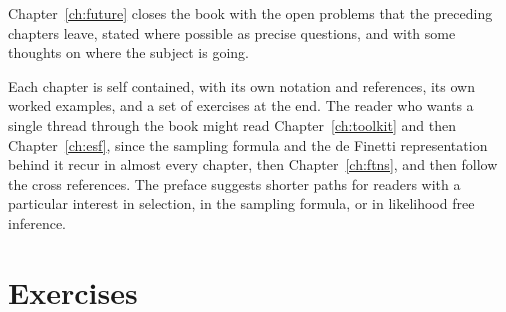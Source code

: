 Chapter~\ref{ch:future} closes the book with the open problems that the preceding chapters leave,
stated where possible as precise questions, and with some thoughts on where the subject is going.

Each chapter is self contained, with its own notation and references, its own worked examples, and
a set of exercises at the end. The reader who wants a single thread through the book might read
Chapter~\ref{ch:toolkit} and then Chapter~\ref{ch:esf}, since the sampling formula and the de
Finetti representation behind it recur in almost every chapter, then Chapter~\ref{ch:ftns}, and
then follow the cross references. The preface suggests shorter paths for readers with a particular
interest in selection, in the sampling formula, or in likelihood free inference.

\section{Exercises}


